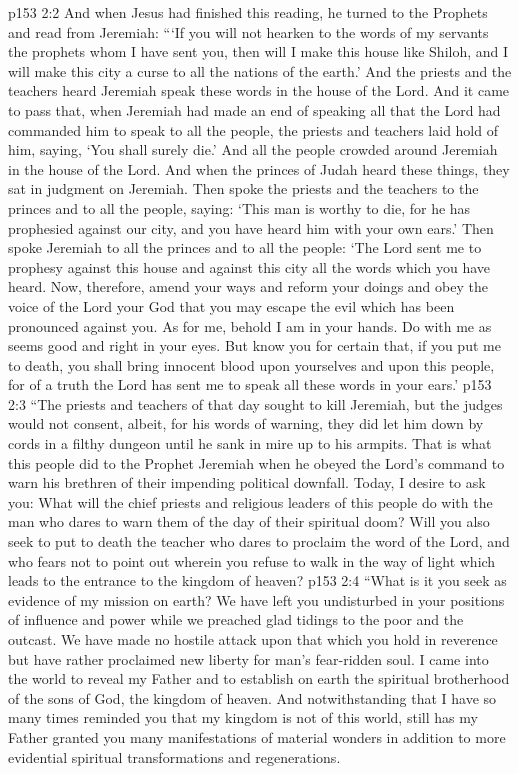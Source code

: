 \vs p153 2:2 And when Jesus had finished this reading, he turned to the Prophets and read from Jeremiah: \textcolor{ubdarkred}{“‘If you will not hearken to the words of my servants the prophets whom I have sent you, then will I make this house like Shiloh, and I will make this city a curse to all the nations of the earth.’ And the priests and the teachers heard Jeremiah speak these words in the house of the Lord. And it came to pass that, when Jeremiah had made an end of speaking all that the Lord had commanded him to speak to all the people, the priests and teachers laid hold of him, saying, ‘You shall surely die.’ And all the people crowded around Jeremiah in the house of the Lord. And when the princes of Judah heard these things, they sat in judgment on Jeremiah. Then spoke the priests and the teachers to the princes and to all the people, saying: ‘This man is worthy to die, for he has prophesied against our city, and you have heard him with your own ears.’ Then spoke Jeremiah to all the princes and to all the people: ‘The Lord sent me to prophesy against this house and against this city all the words which you have heard. Now, therefore, amend your ways and reform your doings and obey the voice of the Lord your God that you may escape the evil which has been pronounced against you. As for me, behold I am in your hands. Do with me as seems good and right in your eyes. But know you for certain that, if you put me to death, you shall bring innocent blood upon yourselves and upon this people, for of a truth the Lord has sent me to speak all these words in your ears.’}
\vs p153 2:3 \textcolor{ubdarkred}{“The priests and teachers of that day sought to kill Jeremiah, but the judges would not consent, albeit, for his words of warning, they did let him down by cords in a filthy dungeon until he sank in mire up to his armpits. That is what this people did to the Prophet Jeremiah when he obeyed the Lord’s command to warn his brethren of their impending political downfall. Today, I desire to ask you: What will the chief priests and religious leaders of this people do with the man who dares to warn them of the day of their spiritual doom? Will you also seek to put to death the teacher who dares to proclaim the word of the Lord, and who fears not to point out wherein you refuse to walk in the way of light which leads to the entrance to the kingdom of heaven?}
\vs p153 2:4 \textcolor{ubdarkred}{“What is it you seek as evidence of my mission on earth? We have left you undisturbed in your positions of influence and power while we preached glad tidings to the poor and the outcast. We have made no hostile attack upon that which you hold in reverence but have rather proclaimed new liberty for man’s fear\hyp{}ridden soul. I came into the world to reveal my Father and to establish on earth the spiritual brotherhood of the sons of God, the kingdom of heaven. And notwithstanding that I have so many times reminded you that my kingdom is not of this world, still has my Father granted you many manifestations of material wonders in addition to more evidential spiritual transformations and regenerations.}
